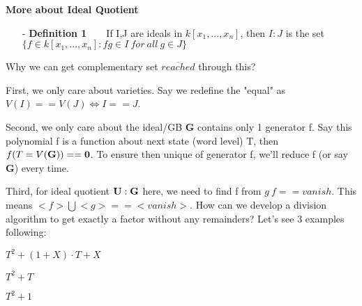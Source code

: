 \documentclass[12pt]{article}
\begin{document}
\hspace{8mm}\par
\textbf{More about Ideal Quotient}
\begin{itemize}
\item[-] \textbf{Definition 1}\ \ \ \ If I,J are ideals in $k[x_1,...,x_n]$, then $I:J$ is the set \\ \indent $\{f\in k[x_1,...,x_n]:fg\in I\ for \ all\ g\in J\}$
\end{itemize} \par
Why we can get complementary set $\overline {reached}$ through this?\par
First, we only care about varieties. Say we redefine the "equal" as $V(I)==V(J)\Leftrightarrow I == J$.\par
Second, we only care about the ideal/GB {\bf G} contains only 1 generator f. Say this polynomial f is a function about next state (word level) T, then $f(T=V(\bf{G}))==0$. To ensure then unique of generator f, we'll reduce f (or say {\bf G}) every time.\par
Third, for ideal quotient ${\bf U:G}$ here, we need to find f from $g~f==vanish$. This means $<f>\bigcup <g>==<vanish>$. How can we develop a division algorithm to get exactly a factor without any remainders? Let's see 3 examples following:\\
\hspace{8mm}\par
\indent $T^2+(1+X)\cdot T+X$\\
\hspace{8mm}\par
\indent $T^2+T$\\
\hspace{8mm}\par
\indent $T^2+1$\\
\end{document}
